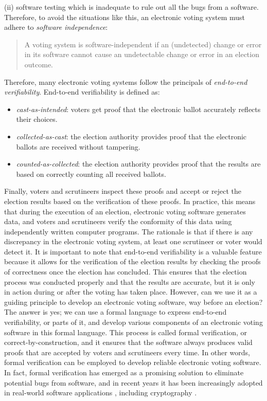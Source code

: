 \documentclass[conference,compsoc]{IEEEtran}
\begin{document}
(ii) software testing which is inadequate to rule out all the bugs 
from a software. Therefore, to avoid the situations like this, 
an electronic voting system must adhere to \textit{software independence}\cite{rivest2008notion}:
\begin{quote}
  A voting system is software-independent if an
  (undetected) change or error in its software cannot
  cause an undetectable change or error in an
  election outcome. 
\end{quote}
\noindent
Therefore, many electronic voting systems follow the principals 
of \textit{end-to-end verifiability}. End-to-end verifiability is 
defined as: 
\begin{itemize}
  \item \textit{cast-as-intended}: voters get proof that the electronic ballot accurately reflects their choices.
  \item \textit{collected-as-cast}: the election authority provides proof that the electronic ballots are received without tampering.
  \item \textit{counted-as-collected}: the election authority provides proof that the results are based on correctly counting all received ballots.
\end{itemize} 


Finally, voters and scrutineers inspect these proofs and accept or reject the election results based on 
the verification of these proofs. In practice, this means that during the execution of an election, 
electronic voting software generates data, and voters and scrutineers verify the conformity of 
this data using independently written computer programs. The rationale is that if there is 
any discrepancy in the electronic voting system, at least one scrutineer or voter would detect it.
It is important to note that end-to-end verifiability is a valuable feature because it 
allows for the verification of the election results by checking the proofs of correctness 
once the election has concluded. This ensures that the election process was conducted 
properly and that the results are accurate, but it is only in action during or after the voting has taken place.
However, can we use it as a guiding principle to develop an electronic voting software, way before 
an election? The answer is yes; we can use a formal language to express end-to-end verifiability, or parts of 
it, and develop various components of an electronic voting 
software in this formal language. This process is called formal verification, or correct-by-construction,
and it ensures that the software always produces valid proofs that 
are accepted by voters and scrutineers every time. In other words, formal verification
can be employed to develop reliable electronic voting software.
In fact, formal verification has emerged as a promising solution 
to eliminate potential bugs from software, and in recent years it has been increasingly 
adopted in real-world software applications \cite{10.1145/1111037.1111042}, 
including cryptography \cite{8835346,10.1145/3133956.3134043,190894,10.1145/2701415,
10.1145/2660267.2660370,10.1145/3319535.3363211}.
\end{document}
